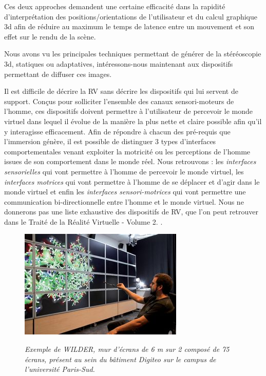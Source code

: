 Ces deux approches demandent une certaine efficacité dans la rapidité d'interprétation des positions/orientations de l'utilisateur et du calcul graphique 3d afin de réduire au maximum le temps de latence entre un mouvement et son effet sur le rendu de la scène.

Nous avons vu les principales techniques permettant de générer de la stéréoscopie 3d, statiques ou adaptatives, intéressons-nous maintenant aux dispositifs permettant de diffuser ces images.

 \label{dispositifs_RV}

Il est difficile de décrire la RV sans décrire les dispositifs qui lui servent de support. Conçus pour solliciter l'ensemble des canaux sensori-moteurs de l'homme, ces dispositifs doivent permettre à l'utilisateur de percevoir le monde virtuel dans lequel il évolue de la manière la plus nette et claire possible afin qu'il y interagisse efficacement.
Afin de répondre à chacun des pré-requis que l'immersion génère, il est possible de distinguer 3 types d'interfaces comportementales venant exploiter la motricité ou les perceptions de l'homme issues de son comportement dans le monde réel.
Nous retrouvons : les \textit{interfaces sensorielles} qui vont permettre à l'homme de percevoir le monde virtuel, les \textit{interfaces motrices} qui vont permettre à l'homme de se déplacer et d'agir dans le monde virtuel et enfin les \textit{interfaces sensori-motrices} qui vont permettre une communication bi-directionnelle entre l'homme et le monde virtuel.
Nous ne donnerons pas une liste exhaustive des dispositifs de RV, que l'on peut retrouver dans le Traité de la Réalité Virtuelle - Volume 2. \cite{fuchs2006traite}.

\begin{figure}[!htb]
  \centering
  {\includegraphics[width=.58\linewidth]{./figures/ch2/screen_wall}}
    \caption[Mur d'écrans WILDER.]{{\it Exemple de WILDER, mur d'écrans de 6 m sur 2 composé de 75 écrans, présent au sein du bâtiment Digiteo sur le campus de l'université Paris-Sud.}}
  \label{Fig:screen_wall}
\end{figure}

